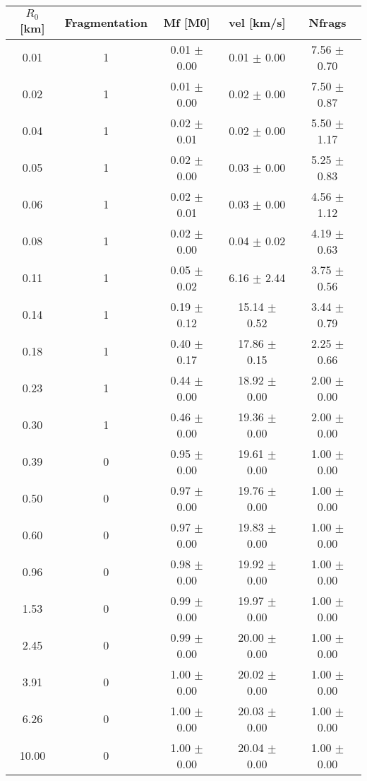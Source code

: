\begin{tabular}{|c||c||c||c||c|}
\toprule
$R_0$ [km] & Fragmentation & Mf [M0] & vel [km/s] & Nfrags \\
\midrule
0.01 & 1 & 0.01 $\pm$ 0.00 & 0.01 $\pm$ 0.00 & 7.56 $\pm$ 0.70 \\
0.02 & 1 & 0.01 $\pm$ 0.00 & 0.02 $\pm$ 0.00 & 7.50 $\pm$ 0.87 \\
0.04 & 1 & 0.02 $\pm$ 0.01 & 0.02 $\pm$ 0.00 & 5.50 $\pm$ 1.17 \\
0.05 & 1 & 0.02 $\pm$ 0.00 & 0.03 $\pm$ 0.00 & 5.25 $\pm$ 0.83 \\
0.06 & 1 & 0.02 $\pm$ 0.01 & 0.03 $\pm$ 0.00 & 4.56 $\pm$ 1.12 \\
0.08 & 1 & 0.02 $\pm$ 0.00 & 0.04 $\pm$ 0.02 & 4.19 $\pm$ 0.63 \\
0.11 & 1 & 0.05 $\pm$ 0.02 & 6.16 $\pm$ 2.44 & 3.75 $\pm$ 0.56 \\
0.14 & 1 & 0.19 $\pm$ 0.12 & 15.14 $\pm$ 0.52 & 3.44 $\pm$ 0.79 \\
0.18 & 1 & 0.40 $\pm$ 0.17 & 17.86 $\pm$ 0.15 & 2.25 $\pm$ 0.66 \\
0.23 & 1 & 0.44 $\pm$ 0.00 & 18.92 $\pm$ 0.00 & 2.00 $\pm$ 0.00 \\
0.30 & 1 & 0.46 $\pm$ 0.00 & 19.36 $\pm$ 0.00 & 2.00 $\pm$ 0.00 \\
0.39 & 0 & 0.95 $\pm$ 0.00 & 19.61 $\pm$ 0.00 & 1.00 $\pm$ 0.00 \\
0.50 & 0 & 0.97 $\pm$ 0.00 & 19.76 $\pm$ 0.00 & 1.00 $\pm$ 0.00 \\
0.60 & 0 & 0.97 $\pm$ 0.00 & 19.83 $\pm$ 0.00 & 1.00 $\pm$ 0.00 \\
0.96 & 0 & 0.98 $\pm$ 0.00 & 19.92 $\pm$ 0.00 & 1.00 $\pm$ 0.00 \\
1.53 & 0 & 0.99 $\pm$ 0.00 & 19.97 $\pm$ 0.00 & 1.00 $\pm$ 0.00 \\
2.45 & 0 & 0.99 $\pm$ 0.00 & 20.00 $\pm$ 0.00 & 1.00 $\pm$ 0.00 \\
3.91 & 0 & 1.00 $\pm$ 0.00 & 20.02 $\pm$ 0.00 & 1.00 $\pm$ 0.00 \\
6.26 & 0 & 1.00 $\pm$ 0.00 & 20.03 $\pm$ 0.00 & 1.00 $\pm$ 0.00 \\
10.00 & 0 & 1.00 $\pm$ 0.00 & 20.04 $\pm$ 0.00 & 1.00 $\pm$ 0.00 \\
\bottomrule
\end{tabular}
